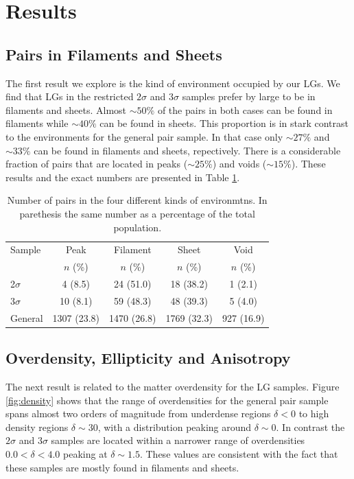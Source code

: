 \documentclass{emulateapj}
\begin{document}
\section{Results}
\label{sec:results}

\subsection{Pairs in Filaments and Sheets}

The first result we explore is the kind of environment occupied by
our LGs. We find that LGs in the restricted $2\sigma$ and $3\sigma$
samples prefer by large to be in filaments and sheets. Almost $\sim 50\%$ of the
pairs in both cases can be found in filaments while $\sim 40\%$ can be
found in sheets. This proportion is in stark contrast to the
environments for the general pair sample. In that case only $\sim
27\%$ and $\sim 33\%$ can be found in filaments and sheets,
repectively. There is a considerable fraction of pairs that are
located in peaks ($\sim 25\%$) and voids ($\sim 15\%$). These results
and the exact numbers are presented in Table \ref{table:web_type}.


\begin{table}
\begin{center}
\begin{tabular}{lcccc}\hline\hline
Sample & Peak & Filament & Sheet & Void\\
       & $n$ (\%) & $n$ (\%) & $n$ (\%) & $n$ (\%) \\\hline
2$\sigma$ & 4 (8.5) & 24 (51.0) &  18 (38.2) & 1 (2.1)\\
3$\sigma$ & 10 (8.1) & 59 (48.3) & 48 (39.3) & 5 (4.0)\\  
General & 1307 (23.8) & 1470 (26.8) & 1769 (32.3) & 927 (16.9)\\\hline
\end{tabular}
\caption{
Number of pairs in the four different kinds of environmtns. In
parethesis the same number as a percentage of the
total population. 
\label{table:web_type}}
\end{center}
\end{table}


\subsection{Overdensity, Ellipticity and Anisotropy}

The next result is related to the matter overdensity for the LG
samples. Figure \ref{fig:density} shows that the range of
overdensities for the general pair sample spans almost two orders of
magnitude from underdense regions $\delta<0$ to high density regions
$\delta\sim 30$, with a distribution peaking around $\delta \sim
0$. In contrast the $2\sigma$ and $3\sigma$ samples are located within
a narrower range of overdensities $0.0<\delta<4.0$ peaking at $\delta
\sim 1.5$. These values are consistent with the fact that these
samples are mostly found in filaments and sheets. 
\end{document}
